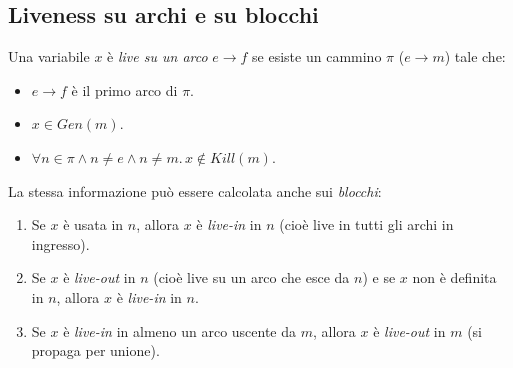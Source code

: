 \documentclass[a4paper,oneside,titlepage]{book}
\begin{document}
\subsection{Liveness su archi e su blocchi}
Una variabile $x$ è \textit{live su un arco} $e \rightarrow f$ se esiste un cammino $\pi$ ($e \rightarrow m$) tale che:
\begin{itemize}
    \item $e \rightarrow f$ è il primo arco di $\pi$.
    \item $x \in Gen(m)$.
    \item $\forall n \in \pi \wedge n \neq e \wedge n \neq m. \, x \notin Kill(m)$.
\end{itemize}
La stessa informazione può essere calcolata anche sui \textit{blocchi}:
\begin{enumerate}[label=(\alph*)]
    \item Se $x$ è usata in $n$, allora $x$ è \textit{live-in} in $n$ (cioè live in tutti gli archi in ingresso).
    \item Se $x$ è \textit{live-out} in $n$ (cioè live su un arco che esce da $n$) e se $x$ non è definita in $n$, allora $x$ è \textit{live-in} in $n$.
    \item Se $x$ è \textit{live-in} in almeno un arco uscente da $m$, allora $x$ è \textit{live-out} in $m$ (si propaga per unione).
\end{enumerate}
\end{document}
